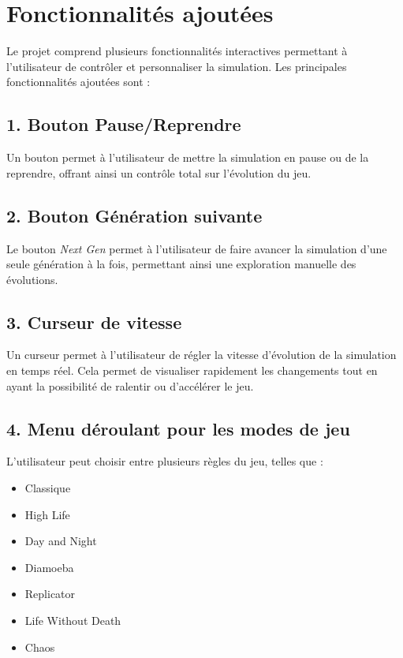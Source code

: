 \documentclass[a4paper,12pt]{article}
\begin{document}
\section*{Fonctionnalités ajoutées}
Le projet comprend plusieurs fonctionnalités interactives permettant à l'utilisateur de contrôler et personnaliser la simulation. Les principales fonctionnalités ajoutées sont :

\subsection*{1. Bouton Pause/Reprendre}
Un bouton permet à l'utilisateur de mettre la simulation en pause ou de la reprendre, offrant ainsi un contrôle total sur l'évolution du jeu.

\subsection*{2. Bouton Génération suivante}
Le bouton \textit{Next Gen} permet à l'utilisateur de faire avancer la simulation d'une seule génération à la fois, permettant ainsi une exploration manuelle des évolutions.

\subsection*{3. Curseur de vitesse}
Un curseur permet à l'utilisateur de régler la vitesse d'évolution de la simulation en temps réel. Cela permet de visualiser rapidement les changements tout en ayant la possibilité de ralentir ou d'accélérer le jeu.

\subsection*{4. Menu déroulant pour les modes de jeu}
L'utilisateur peut choisir entre plusieurs règles du jeu, telles que :
\begin{itemize}
    \item Classique
    \item High Life
    \item Day and Night
    \item Diamoeba
    \item Replicator
    \item Life Without Death
    \item Chaos
\end{itemize}
\end{document}
